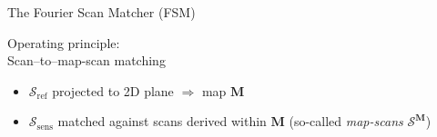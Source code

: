 \begin{frame}[noframenumbering]{The Fourier Scan Matcher (FSM)}


  \begin{center}
    Operating principle: \\
    Scan--to--map-scan matching \\
  \end{center}

  \begin{itemize}
    \item \textcolor{r}{$\mathcal{S}_{\text{ref}}$} projected to 2D plane $\Rightarrow$ map $\bm{M}$
    \item \textcolor{b}{$\mathcal{S}_{\text{sens}}$} matched against scans derived within $\bm{M}$ (so-called \textit{map-scans} $\mathcal{S}^{\bm{M}}$)
  \end{itemize}

\end{frame}
